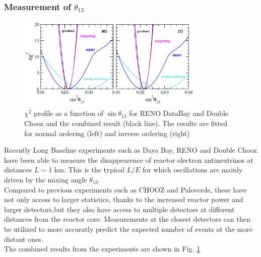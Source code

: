 \documentclass[12pt,a4paper,openright,twoside]{report}
\begin{document}
\subsubsection{Measurement of $\theta_{13}$ }
\begin{figure}
	\centering
	\includegraphics[width=0.8\textwidth]{theta13.png}
	\caption{\label{theta13:fig} $\chi^2$ profile as a function of $\sin\theta_{13}$ for RENO DataBay and Double Chooz and the combined result (black line). The results are fitted for normal ordering (left) and inverse ordering (right)}
\end{figure}
Recently Long Baseline experiments such as Daya Bay, RENO and Double Chooz have been able to measure the disappearence of reactor electron antineutrinos at distances $L\sim$1 km. This is the typical $L/E$ for which oscillations are mainly driven by the mixing angle $\theta_{13}$.\\
Compared to previous experiments such as CHOOZ and Paloverde, these have not only access to larger statistics, thanks to the increased reactor power and larger detectors,but they also have access to multiple detectors at different distances from the reactor core. Measurements at the closest detectors can then be utilized to more accuratly predict the expected number of events at the more distant ones.  \\
The combined results from the experiments are shown in Fig. \ref{theta13:fig}
\end{document}
